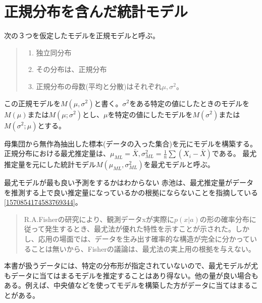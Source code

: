 \section{正規分布を含んだ統計モデル}
次の３つを仮定したモデルを正規モデルと呼ぶ。
\begin{quote}
    \begin{enumerate}[(1)]
    \item 独立同分布
    \item その分布は、正規分布
    \item 正規分布の母数(平均と分散)はそれぞれ$\mu,\sigma^2$。
    \end{enumerate}
\end{quote}
この正規モデルを$M(\mu,\sigma^2)$と書く。$\sigma^2$をある特定の値にしたときのモデルを$M(\mu)$または$M(\mu;\sigma^2)$とし、$\mu$を特定の値にしたモデルを$M(\sigma^2)$または$M(\sigma^2;\mu)$とする。

母集団から無作為抽出した標本(データの入った集合)を元にモデルを構築する。正規分布における最尤推定量は、$\mu_{ML}=\bar{X},\sigma^2_{ML}=\frac{1}{n}\sum(X_i-\bar{X})$である。
最尤推定量を元にした統計モデル$M(\mu_{ML},\sigma^2_{ML})$を最尤モデルと呼ぶ。

\begin{SMbox}{最尤モデルが最も良い予測をするかはわからない}
赤池は、最尤推定量がデータを推測する上で良い推定量になっているかの根拠にならないことを指摘している\ref{1570854174583769344}。
    \begin{quote}
    R.A.Fisherの研究により、観測データxが実際に$p(x|a)$の形の確率分布に従って発生するとき、最尤法が優れた特性を示すことが示された。しかし、応用の場面では、データを生み出す確率的な構造が完全に分かっていることは無いから、Fisherの議論は、最尤法の実上用の根拠を与えない。
    \end{quote}

    本書が扱うデータには、特定の分布形が指定されていないので、最尤モデルが尤もデータに当てはまるモデルを推定することはあり得ない。他の量が良い場合もある。例えば、中央値などを使ってモデルを構築した方がデータに当てはまることがある。
\end{SMbox}

